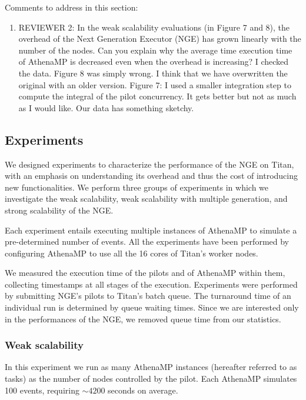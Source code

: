 \ifreview
Comments to address in this section:
\begin{enumerate}
    \item REVIEWER 2: In the weak scalability evaluations (in Figure 7 and
    8), the overhead of the Next Generation Executor (NGE) has grown linearly
    with the number of the nodes. Can you explain why the average time
    execution time of AthenaMP is decreased even when the overhead is
    increasing?
    I checked the data. Figure 8 was simply wrong. I think that we have overwritten the original with an older version.  Figure 7: I used a smaller integration step to compute the integral of the pilot concurrency. It gets better but not as much as I would like. Our data has something sketchy.  
\end{enumerate}
\fi

\subsection{Experiments}
\label{sec:ngeExp}

We designed experiments to characterize the performance of the NGE on Titan,
with an emphasis on understanding its overhead and thus the cost of
introducing new functionalities. We perform three groups of experiments in
which we investigate the weak scalability, weak scalability with multiple
generation, and strong scalability of the NGE.

Each experiment entails executing multiple instances of AthenaMP to simulate
a pre-determined number of events. All the experiments have been performed by
configuring AthenaMP to use all the 16 cores of Titan's worker nodes.

We measured the execution time of the pilots and of AthenaMP within them,
collecting timestamps at all stages of the execution. Experiments were
performed by submitting NGE's pilots to Titan's batch queue. The turnaround
time of an individual run is determined by queue waiting times. Since we are
interested only in the performances of the NGE, we removed queue time from
our statistics.

\subsubsection{Weak scalability}

In this experiment we run as many AthenaMP instances (hereafter referred to
as tasks) as the number of nodes controlled by the pilot. Each AthenaMP
simulates 100 events, requiring $\sim 4200$ seconds on average.

